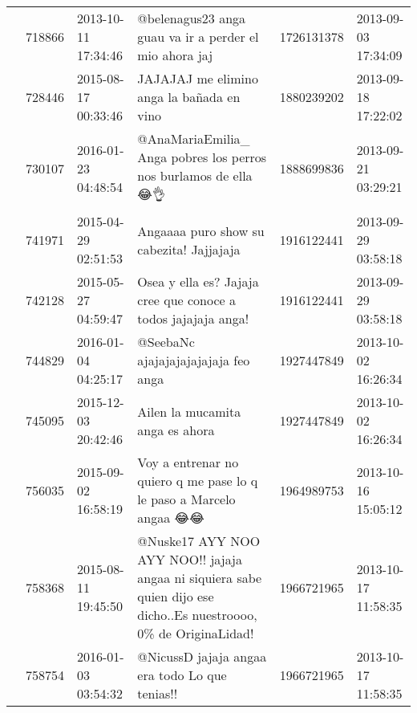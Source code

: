 \begin{tabular}{llllrl}
           & 718866  & 2013-10-11 17:34:46 &                                                                                       @belenagus23 anga guau va ir a perder el mio ahora jaj &  1726131378 & 2013-09-03 17:34:09 \\
           & 728446  & 2015-08-17 00:33:46 &                                                                                                    JAJAJAJ me elimino anga la bañada en vino &  1880239202 & 2013-09-18 17:22:02 \\
           & 730107  & 2016-01-23 04:48:54 &                                                                              @AnaMariaEmilia\_ Anga pobres los perros nos burlamos de ella 😂👌 &  1888699836 & 2013-09-21 03:29:21 \\
           & 741971  & 2015-04-29 02:51:53 &                                                                                                     Angaaaa puro show su cabezita! Jajjajaja &  1916122441 & 2013-09-29 03:58:18 \\
           & 742128  & 2015-05-27 04:59:47 &                                                                                Osea y ella es? Jajaja cree que conoce a todos jajajaja anga! &  1916122441 & 2013-09-29 03:58:18 \\
           & 744829  & 2016-01-04 04:25:17 &                                                                                                          @SeebaNc ajajajajajajajaja feo anga &  1927447849 & 2013-10-02 16:26:34 \\
           & 745095  & 2015-12-03 20:42:46 &                                                                                                              Ailen la mucamita anga es ahora &  1927447849 & 2013-10-02 16:26:34 \\
           & 756035  & 2015-09-02 16:58:19 &                                                                           Voy a entrenar no quiero q me pase lo q le paso a Marcelo angaa 😂😂 &  1964989753 & 2013-10-16 15:05:12 \\
           & 758368  & 2015-08-11 19:45:50 &                            @Nuske17 AYY NOO AYY NOO!! jajaja angaa ni siquiera sabe quien dijo ese dicho..Es nuestroooo, 0\% de OriginaLidad! &  1966721965 & 2013-10-17 11:58:35 \\
           & 758754  & 2016-01-03 03:54:32 &                                                                                               @NicussD jajaja angaa era todo Lo que tenias!! &  1966721965 & 2013-10-17 11:58:35 \\

\end{tabular}
